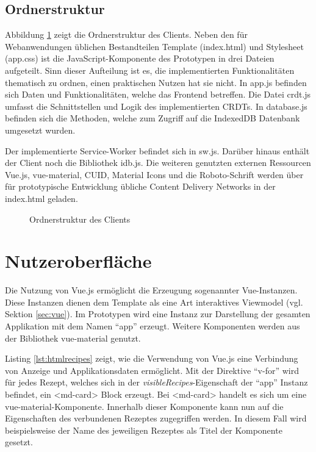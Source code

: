 \documentclass[a4paper, 12pt]{scrreprt}
\begin{document}
\subsection{Ordnerstruktur}

Abbildung \ref{fig:ordnerstruktur} zeigt die Ordnerstruktur des Clients. Neben den für Webanwendungen üblichen Bestandteilen Template (index.html) und Stylesheet (app.css) ist die JavaScript-Komponente des Prototypen in drei Dateien aufgeteilt. Sinn dieser Aufteilung ist es, die implementierten Funktionalitäten thematisch zu ordnen, einen praktischen Nutzen hat sie nicht. In app.js befinden sich Daten und Funktionalitäten, welche das Frontend betreffen. Die Datei crdt.js umfasst die Schnittstellen und Logik des implementierten \acp{CRDT}. In database.js befinden sich die Methoden, welche zum Zugriff auf die IndexedDB Datenbank umgesetzt wurden. 

Der implementierte Service-Worker befindet sich in sw.js. Darüber hinaus enthält der Client noch die Bibliothek idb.js. Die weiteren genutzten externen Ressourcen Vue.js, vue-material, CUID, Material Icons und die Roboto-Schrift werden über für prototypische Entwicklung übliche Content Delivery Networks in der index.html geladen.

\begin{figure}[H]
	\centering
	\begin{minipage}{.3\textwidth}
	\end{minipage}
	\caption{Ordnerstruktur des Clients}
	\label{fig:ordnerstruktur}
\end{figure}

	
\section{Nutzeroberfläche}

Die Nutzung von Vue.js ermöglicht die Erzeugung sogenannter Vue-Instanzen. Diese Instanzen dienen dem Template als eine Art interaktives Viewmodel (vgl. Sektion \ref{sec:vue}). Im Prototypen wird eine Instanz zur Darstellung der gesamten Applikation mit dem Namen \enquote{app} erzeugt. Weitere Komponenten werden aus der Bibliothek vue-material genutzt.

Listing \ref{lst:htmlrecipes} zeigt, wie die Verwendung von Vue.js eine Verbindung von Anzeige und Applikationsdaten ermöglicht. Mit der Direktive \enquote{v-for} wird für jedes Rezept, welches sich in der \textit{visibleRecipes}-Eigenschaft der \enquote{app} Instanz befindet, ein <md-card> Block erzeugt. Bei <md-card> handelt es sich um eine vue-material-Komponente. Innerhalb dieser Komponente kann nun auf die Eigenschaften des verbundenen Rezeptes zugegriffen werden. In diesem Fall wird beispielsweise der Name des jeweiligen Rezeptes als Titel der Komponente gesetzt.
\end{document}
